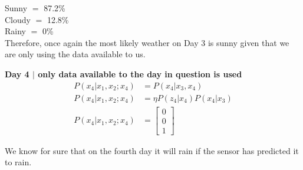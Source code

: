 \documentclass[answers]{exam}
\begin{document}
\begin{questions}
\begin{parts}
\begin{solution}
            Sunny $=$ 87.2\% \\ Cloudy $=$ 12.8\% \\ Rainy $=$ 0\% \\

            Therefore, once again the most likely weather on Day 3 is sunny given that we
            are only using the data available to us.

            \textbf{Day 4 $\mid$ only data available to the day in question is used}
            \begin{align*}
                P(x_4 | x_1, x_2;x_4) & = P(x_4 | x_3, x_4)             \\
                P(x_4 | x_1, x_2;x_4) & = \eta P(z_4 | x_4)P(x_4 | x_3) \\
                P(x_4 | x_1, x_2;x_4) & = \begin{bmatrix}
                                              0 \\
                                              0 \\
                                              1
                                          \end{bmatrix}
            \end{align*}

            We know for sure that on the fourth day it will rain if the sensor has
            predicted it to rain.


\end{solution}
\end{parts}
\end{questions}
\end{document}
